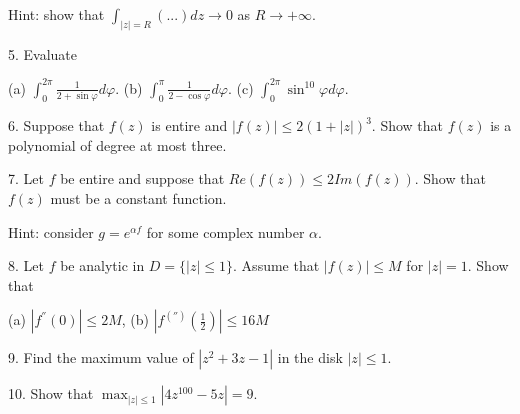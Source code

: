 \documentclass[letterpaper, reqno,11pt]{article}
\begin{document}
Hint: show that $ \int_{|z|=R} (...) dz  \to 0$ as $R\to +\infty$.

\medskip

5. Evaluate

(a) $ \int_0^{2\pi} \frac{1}{2+\sin\varphi} d \varphi $.  (b) $ \int_0^\pi \frac{ 1}{ 2-\cos \varphi} d \varphi$. (c) $\int_0^{2\pi} \sin^{10} \varphi d \varphi $.

\medskip

6. Suppose that $ f(z)$ is entire and $ |f(z)| \leq 2 (1+|z|)^3$. Show that $ f(z)$ is a polynomial of degree at most three.

\medskip


7. Let $f$ be entire and suppose that $ Re (f(z)) \leq 2 Im (f(z))$. Show that $ f(z) $ must be a constant function.


Hint: consider $ g=e^{ \alpha  f}$ for some complex number $ \alpha $.

\medskip


8. Let $ f$ be analytic in $D= \{ |z|\leq 1\}$. Assume that $ |f(z)|\leq M$ for $|z|=1$. Show that

(a) $ |f^{''} (0)|\leq 2M$, (b) $ |f^{('')} (\frac{1}{2})| \leq 16 M$


\medskip

9. Find the maximum value of $ |z^2+3z-1|$ in the disk $ |z|\leq 1$.

\medskip

10. Show that $ \max_{|z|\leq 1} |4 z^{100}-5z| = 9$.

 
\end{document}
